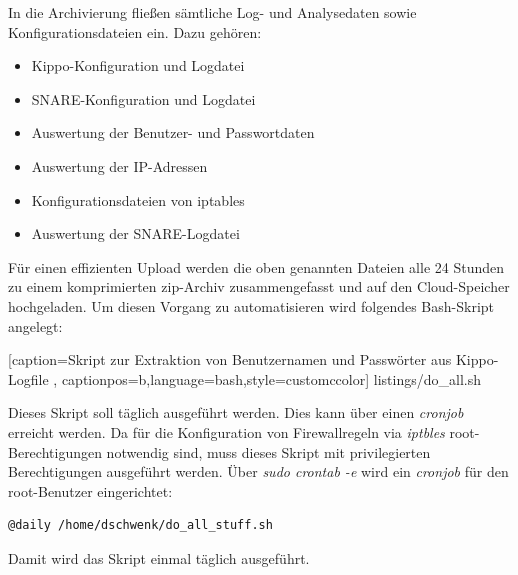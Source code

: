 In die Archivierung fließen sämtliche Log- und Analysedaten sowie Konfigurationsdateien ein. Dazu gehören:

\begin{itemize}
\item Kippo-Konfiguration und Logdatei
\item SNARE-Konfiguration und Logdatei
\item Auswertung der Benutzer- und Passwortdaten
\item Auswertung der IP-Adressen
\item Konfigurationsdateien von iptables
\item Auswertung der SNARE-Logdatei
\end{itemize}

Für einen effizienten Upload werden die oben genannten Dateien alle 24 Stunden zu einem komprimierten zip-Archiv zusammengefasst und auf den Cloud-Speicher hochgeladen. Um diesen Vorgang zu automatisieren wird folgendes Bash-Skript angelegt:


    [caption={Skript zur Extraktion von Benutzernamen und Passwörter aus Kippo-Logfile}
       \label{lst:mitm_onmsg},
       captionpos=b,language=bash,style=customccolor]
 {listings/do_all.sh}
 
Dieses Skript soll täglich ausgeführt werden. Dies kann über einen \textit{cronjob} erreicht werden. Da für die Konfiguration von Firewallregeln via \textit{iptbles} root-Berechtigungen notwendig sind, muss dieses Skript mit privilegierten Berechtigungen ausgeführt werden. Über \textit{sudo crontab -e} wird ein \textit{cronjob} für den root-Benutzer eingerichtet:

\begin{lstlisting}[style=customc]
@daily /home/dschwenk/do_all_stuff.sh
\end{lstlisting}

Damit wird das Skript einmal täglich ausgeführt.